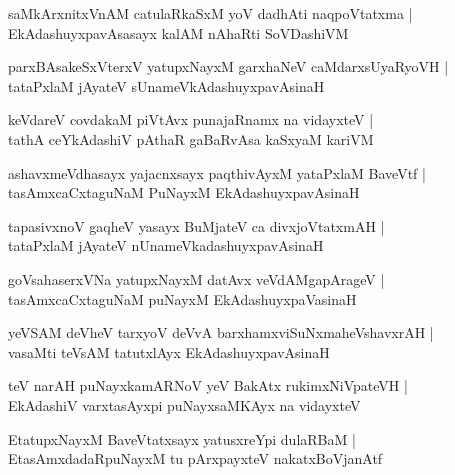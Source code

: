 \documentclass[twoside,12pt,openright]{book}
\newcounter{shloka}[chapter]
\begin{document}
\begin{shloka}%
saMkArxnitxVnAM catulaRkaSxM yoV dadhAti naqpoVtatxma |\\
EkAdashuyxpavAsasayx kalAM nAhaRti SoVDashiVM
\end{shloka}

\begin{shloka}%
parxBAsakeSxVterxV yatupxNayxM garxhaNeV caMdarxsUyaRyoVH |\\
tataPxlaM jAyateV sUnameVkAdashuyxpavAsinaH
\end{shloka}

\begin{shloka}%
keVdareV covdakaM piVtAvx punajaRnamx na vidayxteV |\\
tathA ceYkAdashiV pAthaR gaBaRvAsa kaSxyaM kariVM 
\end{shloka}

\begin{shloka}%
ashavxmeVdhasayx yajacnxsayx paqthivAyxM yataPxlaM BaveVtf |\\
tasAmxcaCxtaguNaM PuNayxM EkAdashuyxpavAsinaH
\end{shloka}

\begin{shloka}%
tapasivxnoV gaqheV yasayx BuMjateV ca divxjoVtatxmAH |\\
tataPxlaM jAyateV nUnameVkadashuyxpavAsinaH
\end{shloka}

\begin{shloka}%
goVsahaserxVNa yatupxNayxM datAvx veVdAMgapArageV |\\
tasAmxcaCxtaguNaM puNayxM EkAdashuyxpaVasinaH
\end{shloka}

\begin{shloka}%
yeVSAM deVheV tarxyoV deVvA barxhamxviSuNxmaheVshavxrAH |\\
vasaMti teVsAM tatutxlAyx EkAdashuyxpavAsinaH
\end{shloka}

\begin{shloka}%
teV narAH puNayxkamARNoV yeV BakAtx rukimxNiVpateVH |\\
EkAdashiV varxtasAyxpi puNayxsaMKAyx na vidayxteV
\end{shloka}

\begin{shloka}%
EtatupxNayxM BaveVtatxsayx yatusxreYpi dulaRBaM |\\
EtasAmxdadaRpuNayxM tu pArxpayxteV nakatxBoVjanAtf
\end{shloka}
\end{document}

